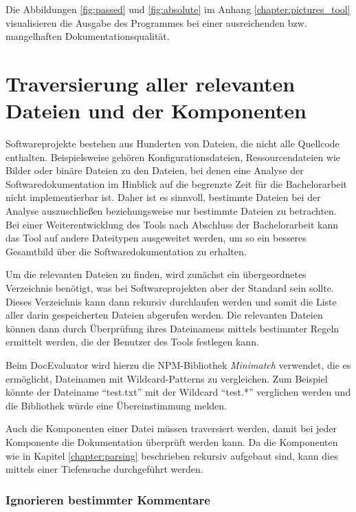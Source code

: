 Die Abbildungen \ref{fig:passed} und \ref{fig:absolute} im Anhang \ref{chapter:pictures_tool} visualisieren die Ausgabe des Programmes bei einer ausreichenden bzw. mangelhaften Dokumentationsqualität.

\section{Traversierung aller relevanten Dateien und der Komponenten}\label{chapter:traversing}
Softwareprojekte bestehen aus Hunderten von Dateien, die nicht alle Quellcode enthalten. Beispielsweise gehören Konfigurationsdateien, Ressourcendateien wie Bilder oder binäre Dateien zu den Dateien, bei denen eine Analyse der Softwaredokumentation im Hinblick auf die begrenzte Zeit für die Bachelorarbeit nicht implementierbar ist. Daher ist es sinnvoll, bestimmte Dateien bei der Analyse auszuschließen beziehungsweise nur bestimmte Dateien zu betrachten. Bei einer Weiterentwicklung des Tools nach Abschluss der Bachelorarbeit kann das Tool auf andere Dateitypen ausgeweitet werden, um so ein besseres Gesamtbild über die Softwaredokumentation zu erhalten.

Um die relevanten Dateien zu finden, wird zunächst ein übergeordnetes Verzeichnis benötigt, was bei Softwareprojekten aber der Standard sein sollte. Dieses Verzeichnis kann dann rekursiv durchlaufen werden und somit die Liste aller darin gespeicherten Dateien abgerufen werden. Die relevanten Dateien können dann durch Überprüfung ihres Dateinamens mittels bestimmter Regeln ermittelt werden, die der Benutzer des Tools festlegen kann.

Beim DocEvaluator wird hierzu die NPM-Bibliothek \textit{Minimatch} \cite{Minimatch} verwendet, die es ermöglicht, Dateinamen mit Wildcard-Patterns zu vergleichen. Zum Beispiel könnte der Dateiname \enquote{test.txt} mit der Wildcard \enquote{test.*} verglichen werden und die Bibliothek würde eine Übereinstimmung melden.

Auch die Komponenten einer Datei müssen traversiert werden, damit bei jeder Komponente die Dokumentation überprüft werden kann. Da die Komponenten wie in Kapitel \ref{chapter:parsing} beschrieben rekursiv aufgebaut sind, kann dies mittels einer Tiefensuche durchgeführt werden.

\subsubsection{Ignorieren bestimmter Kommentare}

